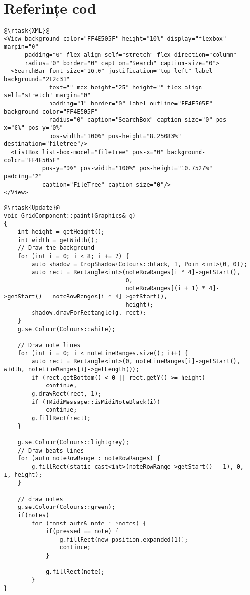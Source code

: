 \newpage

\section{Referințe cod} 
\begin{verbatim}
@\rtask{XML}@
<View background-color="FF4E505F" height="10%" display="flexbox" margin="0"
      padding="0" flex-align-self="stretch" flex-direction="column"
      radius="0" border="0" caption="Search" caption-size="0">
  <SearchBar font-size="16.0" justification="top-left" label-background="212c31"
             text="" max-height="25" height="" flex-align-self="stretch" margin="0"
             padding="1" border="0" label-outline="FF4E505F" background-color="FF4E505F"
             radius="0" caption="SearchBox" caption-size="0" pos-x="0%" pos-y="0%"
             pos-width="100%" pos-height="8.25083%" destination="filetree"/>
  <ListBox list-box-model="filetree" pos-x="0" background-color="FF4E505F"
           pos-y="0%" pos-width="100%" pos-height="10.7527%" padding="2"
           caption="FileTree" caption-size="0"/>
</View>
\end{verbatim}

\begin{verbatim}
@\rtask{Update}@
void GridComponent::paint(Graphics& g)
{
    int height = getHeight();
    int width = getWidth();
    // Draw the background
    for (int i = 0; i < 8; i += 2) {
        auto shadow = DropShadow(Colours::black, 1, Point<int>(0, 0));
        auto rect = Rectangle<int>(noteRowRanges[i * 4]->getStart(),
                                   0,
                                   noteRowRanges[(i + 1) * 4]->getStart() - noteRowRanges[i * 4]->getStart(),
                                   height);
        shadow.drawForRectangle(g, rect);
    }
    g.setColour(Colours::white);

    // Draw note lines
    for (int i = 0; i < noteLineRanges.size(); i++) {
        auto rect = Rectangle<int>(0, noteLineRanges[i]->getStart(), width, noteLineRanges[i]->getLength());
        if (rect.getBottom() < 0 || rect.getY() >= height)
            continue;
        g.drawRect(rect, 1);
        if (!MidiMessage::isMidiNoteBlack(i))
            continue;
        g.fillRect(rect);
    }

    g.setColour(Colours::lightgrey);
    // Draw beats lines
    for (auto noteRowRange : noteRowRanges) {
        g.fillRect(static_cast<int>(noteRowRange->getStart() - 1), 0, 1, height);
    }

    // draw notes
    g.setColour(Colours::green);
    if(notes)
        for (const auto& note : *notes) {
            if(pressed == note) {
                g.fillRect(new_position.expanded(1));
                continue;
            }

            g.fillRect(note);
        }
}
\end{verbatim}

